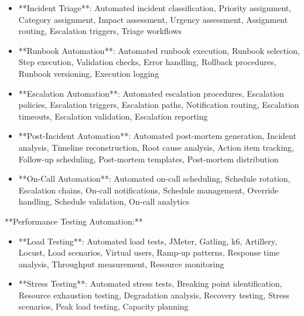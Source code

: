 \documentclass[11pt,a4paper]{article}
\begin{document}
\begin{itemize}
\item **Incident Triage**: Automated incident classification, Priority assignment, Category assignment, Impact assessment, Urgency assessment, Assignment routing, Escalation triggers, Triage workflows
\end{itemize}

\begin{itemize}
\item **Runbook Automation**: Automated runbook execution, Runbook selection, Step execution, Validation checks, Error handling, Rollback procedures, Runbook versioning, Execution logging
\end{itemize}

\begin{itemize}
\item **Escalation Automation**: Automated escalation procedures, Escalation policies, Escalation triggers, Escalation paths, Notification routing, Escalation timeouts, Escalation validation, Escalation reporting
\end{itemize}

\begin{itemize}
\item **Post-Incident Automation**: Automated post-mortem generation, Incident analysis, Timeline reconstruction, Root cause analysis, Action item tracking, Follow-up scheduling, Post-mortem templates, Post-mortem distribution
\end{itemize}

\begin{itemize}
\item **On-Call Automation**: Automated on-call scheduling, Schedule rotation, Escalation chains, On-call notifications, Schedule management, Override handling, Schedule validation, On-call analytics
\end{itemize}

**Performance Testing Automation:**

\begin{itemize}
\item **Load Testing**: Automated load tests, JMeter, Gatling, k6, Artillery, Locust, Load scenarios, Virtual users, Ramp-up patterns, Response time analysis, Throughput measurement, Resource monitoring
\end{itemize}

\begin{itemize}
\item **Stress Testing**: Automated stress tests, Breaking point identification, Resource exhaustion testing, Degradation analysis, Recovery testing, Stress scenarios, Peak load testing, Capacity planning
\end{itemize}
\end{document}

